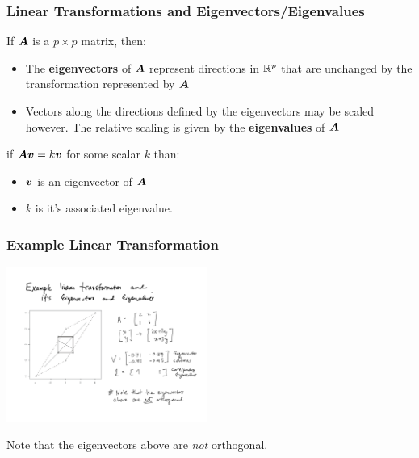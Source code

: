 \documentclass{beamer}
\begin{document}
\begin{frame}
  \frametitle{Linear Transformations and Eigenvectors/Eigenvalues}

If $\bm{A}$ is a $p \times p$ matrix, then:

\begin{itemize}
\item The \textbf{eigenvectors} of $\bm{A}$ represent directions in $\mathbb{R}^p$ that are unchanged by the transformation represented by $\bm{A}$

\item Vectors along the directions defined by the eigenvectors may be scaled however. The relative scaling is given by the \textbf{eigenvalues} of $\bm{A}$

\end{itemize}
\medskip

if $\bm{A}\bm{v} = k\bm{v}$ for some scalar $k$ than:
\begin{itemize}
\item  $\bm{v}$ is an eigenvector of $\bm{A}$ 
\item $k$ is it's associated eigenvalue.
\end{itemize}

\end{frame}
\begin{frame}
  \frametitle{Example Linear Transformation}

\begin{center}
\includegraphics[height=2in]{eigen-example.pdf}
\medskip

Note that the eigenvectors above are \emph{not} orthogonal.

\end{center}  

\end{frame}
\end{document}
